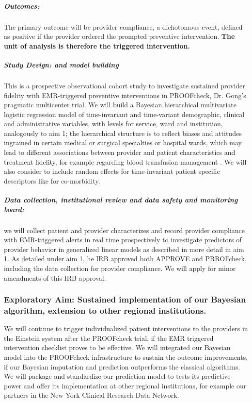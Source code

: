 \documentclass[11pt,notitlepage]{article}
\begin{document}
\subparagraph*{Outcomes:}
The primary outcome will be provider compliance, a dichotomous event, defined as positive if the provider ordered the prompted preventive intervention. \textbf{ The unit of analysis is therefore the triggered intervention.}

\subparagraph*{Study Design: and model building}
This is a prospective observational cohort study to investigate sustained provider fidelity with EMR-triggered preventive interventions in PROOFcheck, Dr. Gong's pragmatic multicenter trial. We will build a Bayesian hierarchical multivariate logistic regression model of time-invariant and time-variant demographic, clinical  and administrative variables, with levels for service, ward and institution, analogously to aim 1; the hierarchical structure is to reflect biases and attitudes ingrained in certain medical or surgical specialties or hospital wards, which may lead to different associations between provider and patient characteristics and treatment fidelity, for example regarding blood transfusion management \cite{Goodnough_23706801}. We will also consider to include random effects for time-invariant patient specific descriptors like for co-morbidity. 

\subparagraph*{Data collection, institutional review and data safety and monitoring board:} we will collect patient and provider characterizes and record provider compliance with EMR-triggered alerts in real time prospectively to investigate predictors of provider behavior in generalized linear models as described in more detail in aim 1. As detailed under aim 1, he IRB approved both APPROVE and PRROFcheck, including the data collection for provider compliance. We will apply for minor amendments of this IRB approval.


\subsubsection*{Exploratory Aim: Sustained implementation of our Bayesian algorithm, extension to other regional institutions.}
We will continue to trigger individualized patient interventions to the providers in the Einstein system after the PROOFcheck trial, if the EMR triggered intervention checklist proves to be effective. We will integrated our Bayesian model into the PROOFcheck infrastructure to sustain the outcome improvements, if our Bayesian imputation and prediction outperforms the classical algorithms. We will package and standardize our prediction model to tests its predictive power and offer its implementation at other regional institutions, for example our partners in the New York Clinical Research Data Network. 
\end{document}
